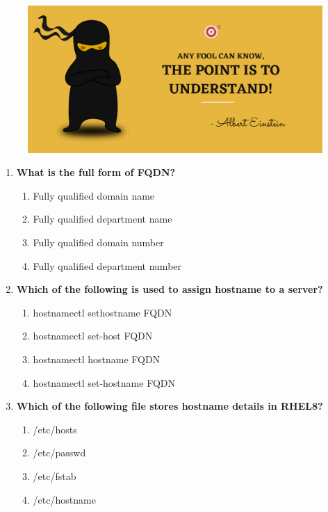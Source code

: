 \setlength{\columnsep}{3pt}
\begin{flushleft}
	
	\paragraph{}
	\bigskip
	
	\begin{figure}[h!]
		\centering
		\includegraphics[scale=.2]{content/practise.jpg}
	\end{figure}	
	\begin{enumerate}
		
		\item \textbf{What is the full form of FQDN?}
		\begin{enumerate}[label=(\alph*)]
			\item Fully qualified domain name  %
			\item Fully qualified department name
			\item Fully qualified domain number
			\item Fully qualified department number
		\end{enumerate}
		\bigskip
		\bigskip
		
		\item \textbf{Which of the following is used to assign hostname to a server?}
		\begin{enumerate}[label=(\alph*)]
			\item hostnamectl sethostname FQDN
			\item hostnamectl set-host FQDN
			\item hostnamectl hostname FQDN
			\item hostnamectl set-hostname FQDN  %
		\end{enumerate}
		\bigskip
		\bigskip	
		
		\item \textbf{Which of the following file stores hostname details in RHEL8?}
		\begin{enumerate}[label=(\alph*)]
			\item /etc/hosts
			\item /etc/passwd
			\item /etc/fstab   
			\item /etc/hostname  %
		\end{enumerate}
		\bigskip
		\bigskip
			

\end{enumerate}
\end{flushleft}
